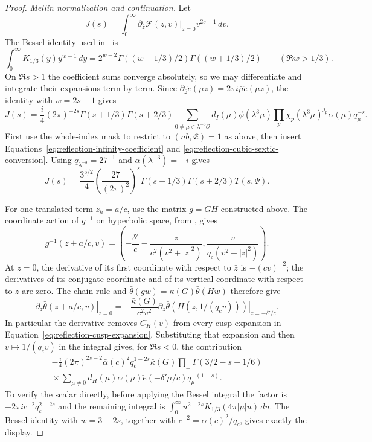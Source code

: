 \documentclass[11pt,a4paper]{article}
\numberwithin{equation}{section}
\numberwithin{figure}{section}
\theoremstyle{definition}
\theoremstyle{remark}
\begin{document}
\begin{proof}
\emph{Mellin normalization and continuation.}
Let
\[
 J(s)=\int_0^\infty
       \left.\partial_{\bar z}\mathcal F(z,v)\right|_{z=0}
       v^{2s-1}\,dv.
\]
The Bessel identity used in~\cite[Lemma~5.3]{DR} is
\[
 \int_0^\infty K_{1/3}(y)y^{w-1}\,dy
  =2^{w-2}\Gamma((w-1/3)/2)\Gamma((w+1/3)/2)
       \qquad(\Re w>1/3).
\]
On $\Re s>1$ the coefficient sums converge absolutely, so we may
differentiate and integrate their expansions term by term.
Since $\partial_{\bar z}\check e(\mu z)=2\pi i\bar\mu\check e(\mu z)$,
the identity with $w=2s+1$ gives
\[
 J(s)=\frac i4(2\pi)^{-2s}\Gamma(s+1/3)\Gamma(s+2/3)
       \sum_{0\ne\mu\in\lambda^{-3}\mathcal O}d_I(\mu)\phi(\lambda^3\mu)
          \prod_p\chi_p(\lambda^3\mu)^{j_p}
          \bar\alpha(\mu)q_\mu^{-s}.
\]
First use the whole-index mask to restrict to $(nb,\mathfrak E)=1$ as above,
then insert Equations~\eqref{eq:reflection-infinity-coefficient} and
\eqref{eq:reflection-cubic-sextic-conversion}.  Using
$q_{\lambda^{-3}}=27^{-1}$ and $\bar\alpha(\lambda^{-3})=-i$ gives
\begin{equation}\label{eq:reflection-direct-mellin}
 J(s)=\frac{3^{5/2}}4\left(\frac{27}{(2\pi)^2}\right)^s
       \Gamma(s+1/3)\Gamma(s+2/3)T(s,\Psi).
\end{equation}

For one translated term $z_h=a/c$, use the matrix $g=GH$ constructed
above.  The coordinate action of $g^{-1}$ on hyperbolic space, from
\cite[Equation (5.1)]{DR}, gives
\[
 g^{-1}(z+a/c,v)=
 \left(-\frac{\delta'}c-\frac{\bar z}{c^2(v^2+|z|^2)},
               \frac{v}{q_c(v^2+|z|^2)}\right).
\]
At $z=0$, the derivative of its first coordinate with respect to
$\bar z$ is $-(cv)^{-2}$; the derivatives of its conjugate coordinate
and of its vertical coordinate with respect to $\bar z$ are zero.
The chain rule and $\bar\theta(gw)=\bar\kappa(G)\bar\theta(Hw)$
therefore give
\[
 \left.\partial_{\bar z}\bar\theta(z+a/c,v)\right|_{z=0}
 =-\frac{\bar\kappa(G)}{c^2v^2}
   \left.\partial_z\bar\theta(H(z,1/(q_cv)))\right|_{z=-\delta'/c}.
\]
In particular the derivative removes $C_H(v)$ from every cusp expansion
in Equation~\eqref{eq:reflection-cusp-expansion}.
Substituting that expansion and then $v\mapsto1/(q_cv)$ in the integral
gives, for $\Re s<0$, the contribution
\begin{equation}\label{eq:reflection-reflected-mellin}
 \begin{split}
 -\frac i4(2\pi)^{2s-2}\bar\alpha(c)^2q_c^{1-2s}\bar\kappa(G)
 \prod_{\pm}\Gamma(3/2-s\pm1/6)\\
 {}
 \times\sum_{\mu\ne0}d_H(\mu)\alpha(\mu)
       \check e(-\delta'\mu/c)q_\mu^{-(1-s)}.
 \end{split}
\end{equation}
To verify the scalar directly, before applying the Bessel integral the
factor is $-2\pi i c^{-2}q_c^{2-2s}$ and the remaining integral is
$\int_0^\infty u^{2-2s}K_{1/3}(4\pi|\mu|u)\,du$.
The Bessel identity with $w=3-2s$, together with
$c^{-2}=\bar\alpha(c)^2/q_c$, gives exactly the display.


\end{proof}
\end{document}
